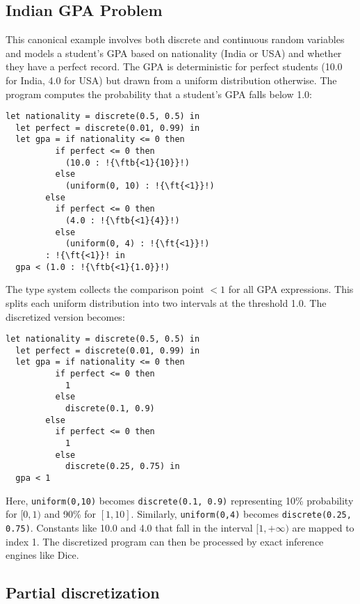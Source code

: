 \documentclass[acmsmall,screen,dvipsnames,x11names,nonacm,anonymous,review]{acmart}
\newcommand{\codetype}[1]{\textcolor{typecolor}{\ttfamily\small#1}}
\newcommand{\ftb}[2]{\codetype{float[\{#1\}; \{#2\}]}}  %
\newcommand{\ft}[1]{\codetype{float[\{#1\}; T]}}        %
\begin{document}
\subsection{Indian GPA Problem}\label{sec:gpa}

This canonical example involves both discrete and continuous random variables and models a student's GPA based on nationality (India or USA) and whether they have a perfect record. The GPA is deterministic for perfect students (10.0 for India, 4.0 for USA) but drawn from a uniform distribution otherwise. The program computes the probability that a student's GPA falls below 1.0:

\begin{lstlisting}[aboveskip=1em,belowskip=1em,escapechar=!]
  let nationality = discrete(0.5, 0.5) in
  let perfect = discrete(0.01, 0.99) in
  let gpa = if nationality <= 0 then
          if perfect <= 0 then
            (10.0 : !{\ftb{<1}{10}}!)
          else
            (uniform(0, 10) : !{\ft{<1}}!)
        else
          if perfect <= 0 then
            (4.0 : !{\ftb{<1}{4}}!)
          else
            (uniform(0, 4) : !{\ft{<1}}!)
        : !{\ft{<1}}! in
  gpa < (1.0 : !{\ftb{<1}{1.0}}!)
\end{lstlisting}

\noindent The type system collects the comparison point $<1$ for all GPA expressions. This splits each uniform distribution into two intervals at the threshold 1.0. The discretized version becomes:

\begin{lstlisting}[aboveskip=1em,belowskip=1em]
  let nationality = discrete(0.5, 0.5) in
  let perfect = discrete(0.01, 0.99) in
  let gpa = if nationality <= 0 then
          if perfect <= 0 then
            1
          else
            discrete(0.1, 0.9)
        else
          if perfect <= 0 then
            1
          else
            discrete(0.25, 0.75) in
  gpa < 1
\end{lstlisting}

\noindent Here, \texttt{uniform(0,10)} becomes \texttt{discrete(0.1, 0.9)} representing 10\% probability for $[0,1)$ and 90\% for $[1,10]$. Similarly, \texttt{uniform(0,4)} becomes \texttt{discrete(0.25, 0.75)}. Constants like 10.0 and 4.0 that fall in the interval $[1,+\infty)$ are mapped to index 1. The discretized program can then be processed by exact inference engines like Dice.

\subsection{Partial discretization}
\end{document}
